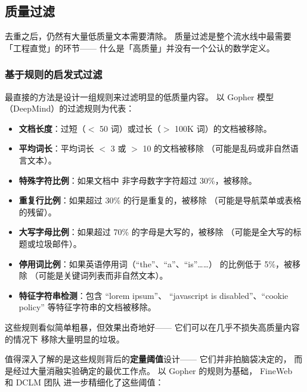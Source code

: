 \subsection{质量过滤}

去重之后，仍然有大量低质量文本需要清除。
质量过滤是整个流水线中最需要「工程直觉」的环节——
什么是「高质量」并没有一个公认的数学定义。

\subsubsection{基于规则的启发式过滤}

最直接的方法是设计一组规则来过滤明显的低质量内容。
以 Gopher 模型（DeepMind）的过滤规则为代表：

\begin{itemize}[noitemsep]
  \item \textbf{文档长度}：过短（$<$ 50 词）或过长（$>$ 100K 词）的文档被移除。
  \item \textbf{平均词长}：平均词长 $<$ 3 或 $>$ 10 的文档被移除
        （可能是乱码或非自然语言文本）。
  \item \textbf{特殊字符比例}：如果文档中
        非字母数字字符超过 30\%，被移除。
  \item \textbf{重复行比例}：如果超过 30\% 的行是重复的，被移除
        （可能是导航菜单或表格的残留）。
  \item \textbf{大写字母比例}：如果超过 70\% 的字母是大写的，被移除
        （可能是全大写的标题或垃圾邮件）。
  \item \textbf{停用词比例}：如果英语停用词（``the''、``a''、``is''……）
        的比例低于 5\%，被移除
        （可能是关键词列表而非自然文本）。
  \item \textbf{特征字符串检测}：包含 ``lorem ipsum''、
        ``javascript is disabled''、``cookie policy''
        等特征字符串的文档被移除。
\end{itemize}

这些规则看似简单粗暴，但效果出奇地好——
它们可以在几乎不损失高质量内容的情况下
移除大量明显的垃圾。

值得深入了解的是这些规则背后的\textbf{定量阈值}设计——
它们并非拍脑袋决定的，
而是经过大量消融实验确定的最优工作点。
以 Gopher 的规则为基础，
FineWeb~\cite{penedo2024fineweb} 和 DCLM 团队
进一步精细化了这些阈值：

